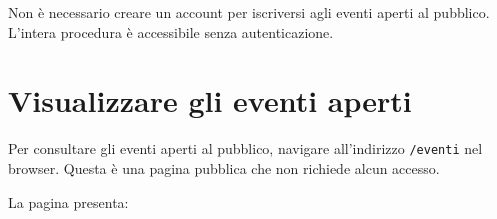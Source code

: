 \documentclass[a4paper,11pt,oneside]{book}
\newcommand{\percorso}[1]{\textcolor{namoCyan}{\texttt{#1}}}
\begin{document}
\begin{infobox}
Non \`e necessario creare un account per iscriversi agli eventi aperti al pubblico. L'intera procedura \`e accessibile senza autenticazione.
\end{infobox}

\section{Visualizzare gli eventi aperti}
\label{sec:visualizzare-eventi-aperti}

Per consultare gli eventi aperti al pubblico, navigare all'indirizzo \percorso{/eventi} nel browser. Questa \`e una pagina pubblica che non richiede alcun accesso.

La pagina presenta:
\end{document}
